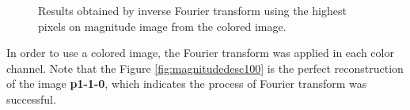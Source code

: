 \documentclass[12pt,a4paper]{article}
\begin{document}
\begin{figure}[!h]
{{		}
		\label{fig:magnitudedesc50}
	}
	\quad
	\quad
	
	\caption{Results obtained by inverse Fourier transform using the highest pixels on magnitude image from the colored image.}
	\label{fig:magnitudeDESCColored}
\end{figure}

In order to use a colored image, the Fourier transform was applied in each color channel. Note that the Figure \ref{fig:magnitudedesc100} is the perfect reconstruction of the image \textbf{p1-1-0}, which indicates the process of Fourier transform was successful.

\newpage
\end{document}
